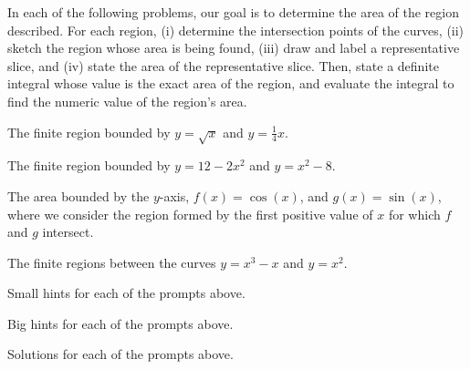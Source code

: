 \begin{activity} \label{A:4.4.2}  In each of the following problems, our goal is to determine the area of the region described.  For each region, (i) determine the intersection points of the curves, (ii) sketch the region whose area is being found, (iii) draw and label a representative slice, and (iv) state the area of the representative slice.  Then, state a definite integral whose value is the exact area of the region, and evaluate the integral to find the numeric value of the region's area.
\ba
	\item The finite region bounded by $y = \sqrt{x}$ and $y = \frac{1}{4}x$.
	\item The finite region bounded by $y = 12-2x^2$ and $y = x^2 - 8$.
	\item The area bounded by the $y$-axis, $f(x) = \cos(x)$, and $g(x) = \sin(x)$, where we consider the region formed by the first positive value of $x$ for which $f$ and $g$ intersect.
	\item The finite regions between the curves $y = x^3-x$ and $y = x^2$.
\ea
\end{activity}
\begin{smallhint}
\ba
	\item Small hints for each of the prompts above.
\ea
\end{smallhint}
\begin{bighint}
\ba
	\item Big hints for each of the prompts above.
\ea
\end{bighint}
\begin{activitySolution}
\ba
	\item Solutions for each of the prompts above.
\ea
\end{activitySolution}
\aftera